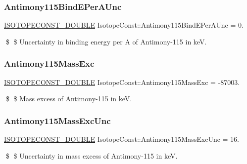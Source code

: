 \subsubsection{\texorpdfstring{Antimony115\+Bind\+E\+Per\+A\+Unc}{Antimony115BindEPerAUnc}}
{\footnotesize\ttfamily \mbox{\hyperlink{group___isotope_const-_macros_ga8f45a7272ce02c0b4c65c44636ed719a}{I\+S\+O\+T\+O\+P\+E\+C\+O\+N\+S\+T\+\_\+\+D\+O\+U\+B\+LE}} Isotope\+Const\+::\+Antimony115\+Bind\+E\+Per\+A\+Unc = 0.}

\$ \$ Uncertainty in binding energy per A of Antimony-\/115 in keV. \mbox{\label{group___isotope_const-_antimony-_sb115_gac3ce5a2aaf6400566ee85d3c1f58217e}} 
\subsubsection{\texorpdfstring{Antimony115\+Mass\+Exc}{Antimony115MassExc}}
{\footnotesize\ttfamily \mbox{\hyperlink{group___isotope_const-_macros_ga8f45a7272ce02c0b4c65c44636ed719a}{I\+S\+O\+T\+O\+P\+E\+C\+O\+N\+S\+T\+\_\+\+D\+O\+U\+B\+LE}} Isotope\+Const\+::\+Antimony115\+Mass\+Exc = -\/87003.}

\$ \$ Mass excess of Antimony-\/115 in keV. \mbox{\label{group___isotope_const-_antimony-_sb115_ga72aeb290e0d6007f136e465d65ca4c38}} 
\subsubsection{\texorpdfstring{Antimony115\+Mass\+Exc\+Unc}{Antimony115MassExcUnc}}
{\footnotesize\ttfamily \mbox{\hyperlink{group___isotope_const-_macros_ga8f45a7272ce02c0b4c65c44636ed719a}{I\+S\+O\+T\+O\+P\+E\+C\+O\+N\+S\+T\+\_\+\+D\+O\+U\+B\+LE}} Isotope\+Const\+::\+Antimony115\+Mass\+Exc\+Unc = 16.}

\$ \$ Uncertainty in mass excess of Antimony-\/115 in keV. \mbox{\label{group___isotope_const-_antimony-_sb115_ga30a8bb4c8f444c9dbd14e88af7c33ae4}} 
